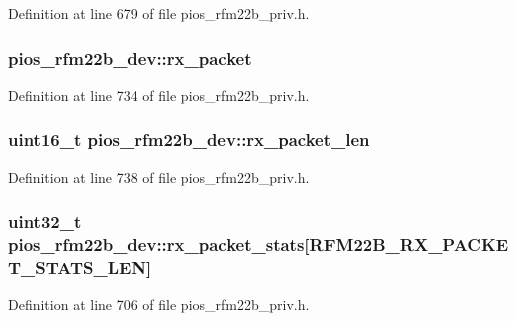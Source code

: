 \-Definition at line 679 of file pios\-\_\-rfm22b\-\_\-priv.\-h.

\hypertarget{structpios__rfm22b__dev_a6c8fb7a4ca0874d372ec084d2089f43c}{
\subsubsection[{rx\-\_\-packet}]{ {\bf pios\-\_\-rfm22b\-\_\-dev\-::rx\-\_\-packet}}}\label{structpios__rfm22b__dev_a6c8fb7a4ca0874d372ec084d2089f43c}


\-Definition at line 734 of file pios\-\_\-rfm22b\-\_\-priv.\-h.

\hypertarget{structpios__rfm22b__dev_acf4806b2fb1db624e1fa47dad08ba447}{
\subsubsection[{rx\-\_\-packet\-\_\-len}]{\setlength{\rightskip}{0pt plus 5cm}uint16\-\_\-t {\bf pios\-\_\-rfm22b\-\_\-dev\-::rx\-\_\-packet\-\_\-len}}}\label{structpios__rfm22b__dev_acf4806b2fb1db624e1fa47dad08ba447}


\-Definition at line 738 of file pios\-\_\-rfm22b\-\_\-priv.\-h.

\hypertarget{structpios__rfm22b__dev_acae5126a75716a87ed65f6d354df1d6a}{
\subsubsection[{rx\-\_\-packet\-\_\-stats}]{\setlength{\rightskip}{0pt plus 5cm}uint32\-\_\-t {\bf pios\-\_\-rfm22b\-\_\-dev\-::rx\-\_\-packet\-\_\-stats}\mbox{[}\-R\-F\-M22\-B\-\_\-\-R\-X\-\_\-\-P\-A\-C\-K\-E\-T\-\_\-\-S\-T\-A\-T\-S\-\_\-\-L\-E\-N\mbox{]}}}\label{structpios__rfm22b__dev_acae5126a75716a87ed65f6d354df1d6a}


\-Definition at line 706 of file pios\-\_\-rfm22b\-\_\-priv.\-h.

